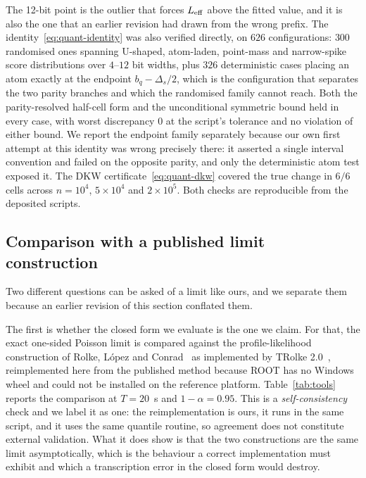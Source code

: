 \documentclass[preprint,12pt]{elsarticle}
\begin{document}
The 12-bit point is the outlier that forces $L_{\rm eff}$ above the fitted
value, and it is also the one that an earlier revision had drawn from the wrong
prefix.  The identity~\eqref{eq:quant-identity} was also verified
directly, on $626$ configurations: $300$ randomised ones spanning U-shaped,
atom-laden, point-mass and narrow-spike score distributions over $4$--$12$ bit
widths, plus $326$ deterministic cases placing an atom exactly at the endpoint
$b_q-\Delta_s/2$, which is the configuration that separates the two parity
branches and which the randomised family cannot reach.  Both the parity-resolved
half-cell form and the unconditional symmetric bound held in every case, with
worst discrepancy $0$ at the script's tolerance and no violation of either
bound.  We report the endpoint family separately because our own first attempt
at this identity was wrong precisely there: it asserted a single interval
convention and failed on the opposite parity, and only the deterministic atom
test exposed it.  The DKW certificate~\eqref{eq:quant-dkw} covered the true
change in $6/6$ cells across $n=10^4$, $5\times10^4$ and $2\times10^5$.  Both
checks are reproducible from the deposited scripts.

\subsection{Comparison with a published limit construction}
\label{sec:tools}

Two different questions can be asked of a limit like ours, and we separate them
because an earlier revision of this section conflated them.

The first is whether the closed form we evaluate is the one we claim.  For that,
the exact one-sided Poisson limit is compared against the profile-likelihood
construction of Rolke, L\'opez and Conrad~\cite{Rolke2005} as implemented by
TRolke 2.0~\cite{Lundberg2010TRolke}, reimplemented here from the published
method because ROOT has no Windows wheel and could not be installed on the
reference platform.  Table~\ref{tab:tools} reports the comparison at
$T=20$~s and $1-\alpha=0.95$.  This is a \emph{self-consistency} check and we
label it as one: the reimplementation is ours, it runs in the same script, and it
uses the same quantile routine, so agreement does not constitute external
validation.  What it does show is that the two constructions are the same limit
asymptotically, which is the behaviour a correct implementation must exhibit and
which a transcription error in the closed form would destroy.
\end{document}

